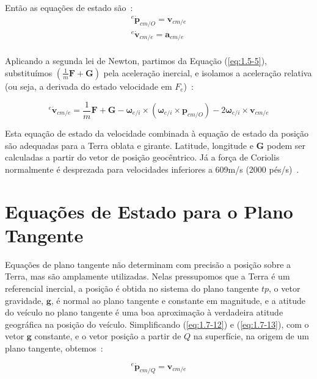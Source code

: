 Então as equações de estado são~\cite{Stevens2016}:
\begin{align}\label{eq:1.7-12}
   {^{e}{\dot{\mathbf{p}}}_{cm/O}} = \mathbf{v}_{cm/e} \\
   {^{e}{\dot{\mathbf{v}}}_{cm/e}} = \mathbf{a}_{cm/e} \\
\end{align}

Aplicando a segunda lei de Newton, partimos da Equação (\ref{eq:1.5-5}), substituímos \(\left( \textstyle{\frac{1}{m}}\mathbf{F} + \mathbf{G}\right)\) pela aceleração inercial, e isolamos a aceleração relativa (ou seja, a derivada do estado velocidade em \(F_{e}\))~\cite{Stevens2016}:

\begin{equation}\label{eq:1.7-13}
   {^{e}{\dot{\mathbf{v}}_{cm/e}}} = \textstyle{\frac{1}{m}} \mathbf{F} + \mathbf{G} - \mathbf{\omega}_{e/i} \times \left( \mathbf{\omega}_{e/i} \times \mathbf{p}_{cm/O} \right) - 2 \mathbf{\omega}_{e/i} \times \mathbf{v}_{cm/e}
\end{equation}

Esta equação de estado da velocidade combinada à equação de estado da posição são adequadas para a Terra oblata e girante. Latitude, longitude e \(\mathbf{G}\) podem ser calculadas a partir do vetor de posição geocêntrico. Já a força de Coriolis normalmente é desprezada para velocidades inferiores a 609m/s (2000 pés/s)~\cite{Stevens2016}.

\section{Equações de Estado para o Plano Tangente}

Equações de plano tangente não determinam com precisão a posição sobre a Terra, mas são amplamente utilizadas. Nelas pressupomos que a Terra é um referencial inercial, a posição é obtida no sistema do plano tangente \(tp\), o vetor gravidade, \(\mathbf{g}\), é normal ao plano tangente e constante em magnitude, e a atitude do veículo no plano tangente é uma boa aproximação à verdadeira atitude geográfica na posição do veículo. Simplificando (\ref{eq:1.7-12}) e (\ref{eq:1.7-13}), com o vetor \(\mathbf{g}\) constante, e o vetor posição a partir de \(Q\) na superfície, na origem de um plano tangente, obtemos~\cite{Stevens2016}:

\begin{equation}\label{eq:1.7-15}
   {^{e}{\dot{\mathbf{p}}_{cm/Q}}} = \mathbf{v}_{cm/e}
\end{equation}

